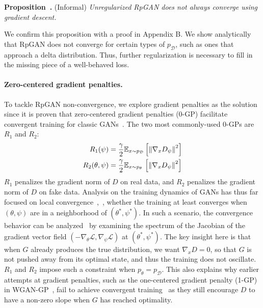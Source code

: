 \vspace{1ex}
\noindent \textbf{Proposition~.} (Informal) \emph{Unregularized RpGAN does not always converge using gradient descent.}
\vspace{1ex}

\noindent We confirm this proposition with a proof in Appendix B. 
We show analytically that RpGAN does not converge for certain types of $p_\mathcal{D}$, such as ones that approach a delta distribution. Thus, further regularization is necessary to fill in the missing piece of a well-behaved loss.

\paragraph{Zero-centered gradient penalties.}
To tackle RpGAN non-convergence, we explore gradient penalties as the solution since it is proven that zero-centered gradient penalties (0-GP) facilitate convergent training for classic GANs~\cite{r1}. The two most commonly-used 0-GPs are $R_1$ and $R_2$:
\begin{equation}
\begin{aligned}
R_1(\psi)&=\frac{\gamma}{2}\mathbb{E}_{x\sim p_\mathcal{D}}\left[\left\| \nabla_x D_\psi \right \|^2\right]\\ 
R_2(\theta,\psi)&=\frac{\gamma}{2}\mathbb{E}_{x\sim p_\theta}\hspace{0.06cm}\left[\left\| \nabla_x D_\psi \right \|^2\right]
\end{aligned}
\end{equation}
$R_1$ penalizes the gradient norm of $D$ on real data, and $R_2$ penalizes the gradient norm of $D$ on fake data. Analysis on the training dynamics of GANs has thus far focused on local convergence~\cite{nagarajan2017gradient,gannum,r1},~\ie, whether the training at least converges when $(\theta,\psi)$ are in a neighborhood of $(\theta^*,\psi^*)$. In such a scenario, the convergence behavior can be analyzed~\cite{nagarajan2017gradient,gannum,r1} by examining the spectrum of the Jacobian of the gradient vector field $\left(-\nabla_\theta\mathcal{L},\nabla_\psi\mathcal{L} \right )$ at $(\theta^*,\psi^*)$. The key insight here is that when $G$ already produces the true distribution, we want $\nabla_x D=0$, so that $G$ is not pushed away from its optimal state, and thus the training does not oscillate. $R_1$ and $R_2$ impose such a constraint when $p_\theta=p_\mathcal{D}$. This also explains why earlier attempts at gradient penalties, such as the one-centered gradient penalty (1-GP) in WGAN-GP~\cite{wgan-gp}, fail to achieve convergent training~\cite{r1} as they still encourage $D$ to have a non-zero slope when $G$ has reached optimality.

